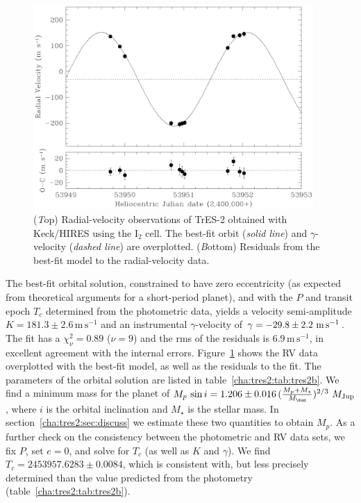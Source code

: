 \begin{figure}
\begin{center}
\includegraphics[width=0.95\textwidth]{4_f2}
\caption[Radial-velocity observations of TrES-2]{({\textit Top}) Radial-velocity observations of TrES-2 obtained
  with Keck/HIRES using the I$_{2}$ cell. The best-fit orbit
  (\textit{solid line}) and $\gamma$-velocity (\textit{dashed line})
  are overplotted. ({\textit Bottom}) Residuals from the best-fit
  model to the radial-velocity data.}\label{cha:tres2:fig:rvtres2}
\end{center}
\end{figure}

The best-fit orbital solution, constrained to have zero eccentricity
(as expected from theoretical arguments for a short-period planet),
and with the $P$ and transit epoch $T_{c}$ determined from the
photometric data, yields a velocity semi-amplitude $K =
181.3\pm2.6\,\mathrm{m\,s^{-1}}$ and an instrumental
${\gamma}$-velocity of ${\gamma} = -29.8 \pm 2.2\ {\rm m\,
  s^{-1}}$. The fit has a $\chi^2_\nu = 0.89$ ($\nu=9$) and the rms of the
residuals is $6.9\,\mathrm{m\,s^{-1}}$, in excellent agreement with
the internal errors.  Figure~\ref{cha:tres2:fig:rvtres2} shows the RV data
overplotted with the best-fit model, as well as the residuals to the
fit. The parameters of the orbital solution are listed in
table~\ref{cha:tres2:tab:tres2b}. We find a minimum mass for the planet of
$M_{p}\, \sin{i} = 1.206 \pm 0.016\, (\frac{M_p + M_{\star}}{M_{\sun}})^{2/3}\ M_{\rm Jup}$,
where $i$ is
the orbital inclination and $M_{\star}$
is the stellar mass.  In section~\ref{cha:tres2:sec:discuss} we estimate these two quantities to obtain
$M_{p}$.  As a further check on the consistency between the
photometric and RV data sets, we fix $P$, set $e=0$, and solve for
$T_c$ (as well as $K$ and ${\gamma}$).  We find $T_{c}=2453957.6283
\pm 0.0084$, which is consistent with, but less precisely determined
than the value predicted from the photometry (table~\ref{cha:tres2:tab:tres2b}).

